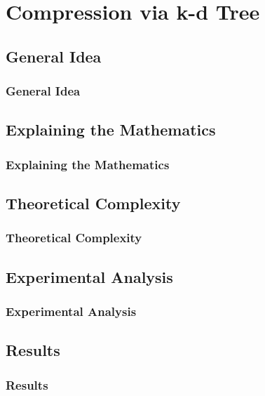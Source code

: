 \documentclass{beamer}
\begin{document}
\section{Compression via k-d Tree}
\subsection{General Idea}
\begin{frame}
  \frametitle{General Idea}
\end{frame}
\subsection{Explaining the Mathematics}
\begin{frame}
  \frametitle{Explaining the Mathematics}
\end{frame}
\subsection{Theoretical Complexity}
\begin{frame}
  \frametitle{Theoretical Complexity}
\end{frame}
\subsection{Experimental Analysis}
\begin{frame}
  \frametitle{Experimental Analysis}
\end{frame}
\subsection{Results}
\begin{frame}
  \frametitle{Results}
\end{frame}





    
\end{document}
